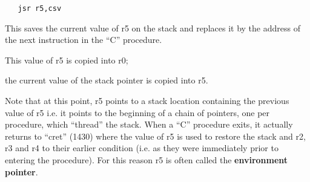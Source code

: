 \begin{verbatim}
   jsr r5,csv
\end{verbatim}

This saves the current value of r5 on
the stack and replaces it by the
address of the next instruction in the
``C'' procedure.

\bd
\item[1421:] This value of r5 is copied into r0;

\item[1422:] the current value of the stack
 pointer is copied into r5.
\ed


Note that at this point, r5 points to a
stack location containing the previous
value of r5 i.e. it points to the
beginning of a chain of pointers, one
per procedure, which ``thread'' the
stack. When a ``C'' procedure exits, it
actually returns to ``cret'' (1430) where
the value of r5 is used to restore the
stack and r2, r3 and r4 to their earlier condition (i.e. as they were
immediately prior to entering the procedure). For this reason r5 is often
called the {\bf environment pointer}.

